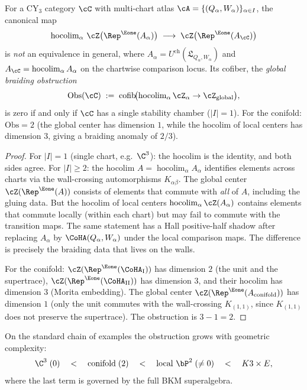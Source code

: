 \begin{proposition}
\label{prop:center-hocolim}
For a CY$_3$ category $\cC$ with multi-chart atlas $\cA = \{(Q_\alpha, W_\alpha)\}_{\alpha \in I}$, the canonical map
\[
 \operatorname{hocolim}_\alpha \, \cZ\bigl(\Rep^{\Eone}(A_\alpha)\bigr) \;\longrightarrow\; \cZ\bigl(\Rep^{\Eone}(A_\cC)\bigr)
\]
is \emph{not} an equivalence in general, where $A_\alpha = U^{\mathrm{ch}}(\mathfrak L_{Q_\alpha,W_\alpha})$ and $A_\cC = \operatorname{hocolim}_\alpha A_\alpha$ on the chartwise comparison locus. Its cofiber, the \emph{global braiding obstruction}
\[
 \mathrm{Obs}(\cC) \;:=\; \mathrm{cofib}\!\bigl(\operatorname{hocolim}_\alpha \cZ_\alpha \to \cZ_{\mathrm{global}}\bigr),
\]
is zero if and only if $\cC$ has a single stability chamber ($|I| = 1$). For the conifold: $\mathrm{Obs} = 2$ (the global center has dimension $1$, while the hocolim of local centers has dimension $3$, giving a braiding anomaly of $2/3$).
\end{proposition}

\begin{proof}
For $|I| = 1$ (single chart, e.g.\ $\C^3$): the hocolim is the identity, and both sides agree. For $|I| \geq 2$: the hocolim $A = \operatorname{hocolim}_\alpha A_\alpha$ identifies elements across charts via the wall-crossing automorphisms $K_{\alpha\beta}$. The global center $\cZ(\Rep^{\Eone}(A))$ consists of elements that commute with \emph{all} of $A$, including the gluing data. But the hocolim of local centers $\operatorname{hocolim}_\alpha \cZ(A_\alpha)$ contains elements that commute locally (within each chart) but may fail to commute with the transition maps. The same statement has a Hall positive-half shadow after replacing $A_\alpha$ by $\CoHA(Q_\alpha,W_\alpha)$ under the local comparison maps. The difference is precisely the braiding data that lives on the walls.

For the conifold: $\cZ(\Rep^{\Eone}(\CoHA_{\mathrm{I}}))$ has dimension $2$ (the unit and the supertrace), $\cZ(\Rep^{\Eone}(\CoHA_{\mathrm{II}}))$ has dimension $3$, and their hocolim has dimension $3$ (Morita embedding). The global center $\cZ(\Rep^{\Eone}(A_{\text{conifold}}))$ has dimension $1$ (only the unit commutes with the wall-crossing $K_{(1,1)}$, since $K_{(1,1)}$ does not preserve the supertrace). The obstruction is $3 - 1 = 2$.
\end{proof}

On the standard chain of examples the obstruction grows with geometric
complexity:
\[
\C^3\;(0)\quad <\quad \text{conifold}\;(2)\quad <\quad
\text{local }\bP^2\;(\neq0)\quad <\quad K3\times E,
\]
where the last term is governed by the full BKM superalgebra.

